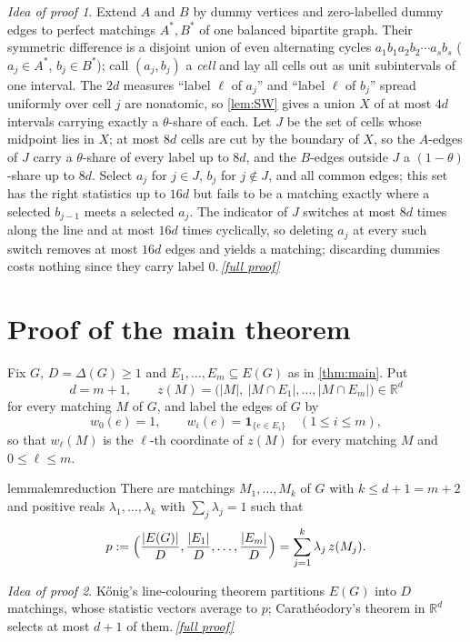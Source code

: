 \documentclass[11pt,a4paper]{article}
\theoremstyle{plain}
\theoremstyle{definition}
\theoremstyle{remark}
\newtheorem*{proofidea}{Idea of proof}
\newcommand{\fullproofref}[1]{\,\hyperref[#1]{\textit{[full proof]}}}
\newcommand{\R}{\mathbb R}
\newcommand{\ind}[1]{\mathbf 1_{\{#1\}}}
\begin{document}
\begin{proofidea}
Extend $A$ and $B$ by dummy vertices and zero-labelled dummy edges to perfect matchings $A^*,B^*$ of one balanced bipartite graph. Their symmetric difference is a disjoint union of even alternating cycles $a_1b_1a_2b_2\cdots a_sb_s$ ($a_j\in A^*$, $b_j\in B^*$); call $(a_j,b_j)$ a \emph{cell} and lay all cells out as unit subintervals of one interval. The $2d$ measures ``label $\ell$ of $a_j$'' and ``label $\ell$ of $b_j$'' spread uniformly over cell $j$ are nonatomic, so \cref{lem:SW} gives a union $X$ of at most $4d$ intervals carrying exactly a $\theta$-share of each. Let $J$ be the set of cells whose midpoint lies in $X$; at most $8d$ cells are cut by the boundary of $X$, so the $A$-edges of $J$ carry a $\theta$-share of every label up to $8d$, and the $B$-edges outside $J$ a $(1-\theta)$-share up to $8d$. Select $a_j$ for $j\in J$, $b_j$ for $j\notin J$, and all common edges; this set has the right statistics up to $16d$ but fails to be a matching exactly where a selected $b_{j-1}$ meets a selected $a_j$. The indicator of $J$ switches at most $8d$ times along the line and at most $16d$ times cyclically, so deleting $a_j$ at every such switch removes at most $16d$ edges and yields a matching; discarding dummies costs nothing since they carry label $0$.\fullproofref{pf:interp}
\end{proofidea}

\section{Proof of the main theorem}\label{sec:proof}

Fix $G$, $D=\Delta(G)\ge1$ and $E_1,\dots,E_m\subseteq E(G)$ as in \cref{thm:main}. Put
\[
 d=m+1,\qquad z(M)=\bigl(|M|,\ |M\cap E_1|,\dots,|M\cap E_m|\bigr)\in\R^d
\]
for every matching $M$ of $G$, and label the edges of $G$ by
\begin{equation}\label{eq:labels}
 w_0(e)=1,\qquad w_i(e)=\ind{e\in E_i}\quad(1\le i\le m),
\end{equation}
so that $w_\ell(M)$ is the $\ell$-th coordinate of $z(M)$ for every matching $M$ and $0\le\ell\le m$.

\begin{restatable}{lemma}{lemreduction}\label{lem:reduction}
There are matchings $M_1,\dots,M_k$ of $G$ with $k\le d+1=m+2$ and positive reals $\lambda_1,\dots,\lambda_k$ with $\sum_j\lambda_j=1$ such that
\begin{equation}\label{eq:caratheodory}
 p:=\Bigl(\frac{|E(G)|}{D},\frac{|E_1|}{D},\dots,\frac{|E_m|}{D}\Bigr)=\sum_{j=1}^k\lambda_j\,z(M_j).
\end{equation}
\end{restatable}
\begin{proofidea}
Kőnig's line-colouring theorem partitions $E(G)$ into $D$ matchings, whose statistic vectors average to $p$; Carathéodory's theorem in $\R^d$ selects at most $d+1$ of them.\fullproofref{pf:reduction}
\end{proofidea}
\end{document}
